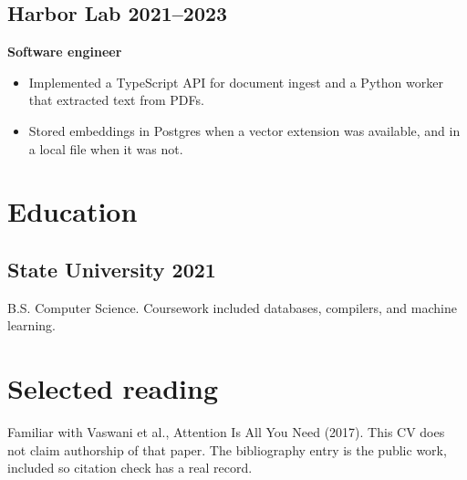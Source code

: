\documentclass[11pt]{article}
\begin{document}
\subsection*{Harbor Lab \hfill 2021--2023}
\textbf{Software engineer}
\begin{itemize}
\item Implemented a TypeScript API for document ingest and a Python worker that extracted text from PDFs.
\item Stored embeddings in Postgres when a vector extension was available, and in a local file when it was not.
\end{itemize}

\section*{Education}
\subsection*{State University \hfill 2021}
B.S. Computer Science. Coursework included databases, compilers, and machine learning.

\section*{Selected reading}
Familiar with Vaswani et al., Attention Is All You Need (2017). This CV does not claim authorship of that paper. The bibliography entry is the public work, included so citation check has a real record.
\end{document}
